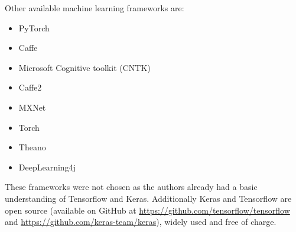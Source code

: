 \vspace{0.5cm}

Other available machine learning frameworks are:

\begin{itemize}
	\item PyTorch
	\item Caffe
	\item Microsoft Cognitive toolkit (CNTK)
	\item Caffe2
	\item MXNet
	\item Torch
	\item Theano
	\item DeepLearning4j
\end{itemize}

These frameworks were not chosen as the authors already had a basic understanding of Tensorflow and Keras. Additionally Keras and Tensorflow are open source (available on GitHub at \url{https://github.com/tensorflow/tensorflow} and \url{https://github.com/keras-team/keras}), widely used and free of charge.

\filbreak
